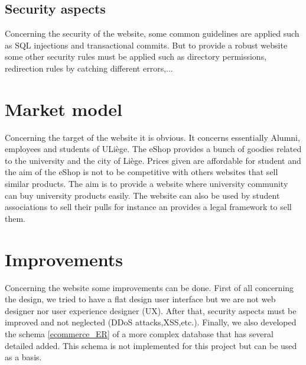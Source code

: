 \documentclass{article}
\begin{document}
\subsection{Security aspects}
Concerning the security of the website, some common guidelines are applied such as SQL injections and transactional commits. But to provide a robust website some other security rules must be applied such as directory permissions, redirection rules by catching different errors,...

\section{Market model}
Concerning the target of the website it is obvious. It concerns essentially Alumni, employees and students of ULiège. The eShop provides a bunch of goodies related to the university and the city of Liège. Prices given are affordable for student and the aim of the eShop is not to be competitive with others websites that sell similar products. The aim is to provide a website where university community can buy university products easily. The website can also be used by student associations to sell their pulls for instance an provides a legal framework to sell them.

\section{Improvements}
Concerning the website some improvements can be done. First of all concerning the design, we tried to have a flat design user interface but we are not web designer nor user experience designer (UX). After that, security aspects must be improved and not neglected (DDoS attacks,XSS,etc.). Finally, we also developed the schema \autoref{ecommerce_ER} of a more complex database that has several detailed added. This schema is not implemented for this project but can be used as a basis. 
\end{document}
